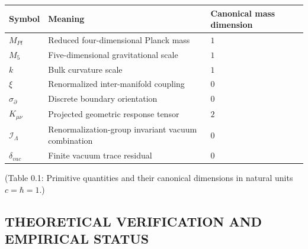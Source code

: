 \documentclass[aps,prd,onecolumn,superscriptaddress,nofootinbib,longbibliography,10pt]{revtex4-2}
\begin{document}
  
\begin{center}
\begin{tabular}{|lll|}
\hline

      Symbol & Meaning & Canonical mass dimension
       \\ \hline

    
    
      \(M_{Pl}\) & Reduced four-dimensional Planck mass & \(1\) \\ \hline

      \(M_5\) & Five-dimensional gravitational scale & \(1\) \\ \hline

      \(k\) & Bulk curvature scale & \(1\) \\ \hline

      \(\xi\) & Renormalized inter-manifold coupling & \(0\) \\ \hline

      \(\sigma_\partial\) & Discrete boundary orientation & \(0\) \\ \hline

      \(K_{\mu\nu}\) & Projected geometric response tensor & \(2\) \\ \hline

      \(\mathcal{I}_\Lambda\) & Renormalization-group invariant vacuum combination & \(0\) \\ \hline

      \(\delta_{vac}\) & Finite vacuum trace residual & \(0\) \\ \hline

    
  \end{tabular}
\end{center}

  (Table 0.1: Primitive quantities and their canonical dimensions in natural units \(c = \hbar = 1\).)


  
  
\subsection*{THEORETICAL VERIFICATION AND EMPIRICAL STATUS}
\end{document}
